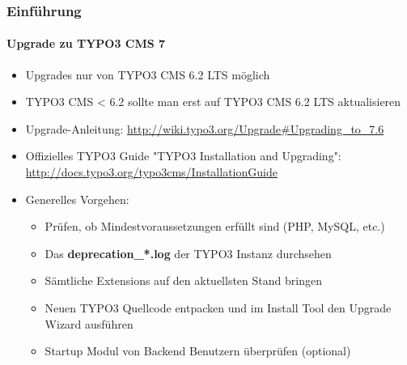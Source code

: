 \begin{frame}[fragile]
	\frametitle{Einführung}
	\framesubtitle{Upgrade zu TYPO3 CMS 7}

	\begin{itemize}
		\item Upgrades nur von TYPO3 CMS 6.2 LTS möglich
		\item TYPO3 CMS < 6.2 sollte man erst auf TYPO3 CMS 6.2 LTS aktualisieren
	\end{itemize}

	\begin{itemize}

		\item Upgrade-Anleitung:\newline
			\smaller\url{http://wiki.typo3.org/Upgrade#Upgrading_to_7.6}\normalsize
		\item Offizielles TYPO3 Guide "TYPO3 Installation and Upgrading":
			\smaller\url{http://docs.typo3.org/typo3cms/InstallationGuide}\normalsize
		\item Generelles Vorgehen:
			\begin{itemize}
				\item Prüfen, ob Mindestvoraussetzungen erfüllt sind \small(PHP, MySQL, etc.)
				\item Das \textbf{deprecation\_*.log} der TYPO3 Instanz durchsehen
				\item Sämtliche Extensions auf den aktuellsten Stand bringen
				\item Neuen TYPO3 Quellcode entpacken und im Install Tool den Upgrade Wizard ausführen
				\item Startup Modul von Backend Benutzern überprüfen (optional)
			\end{itemize}
	\end{itemize}

\end{frame}

